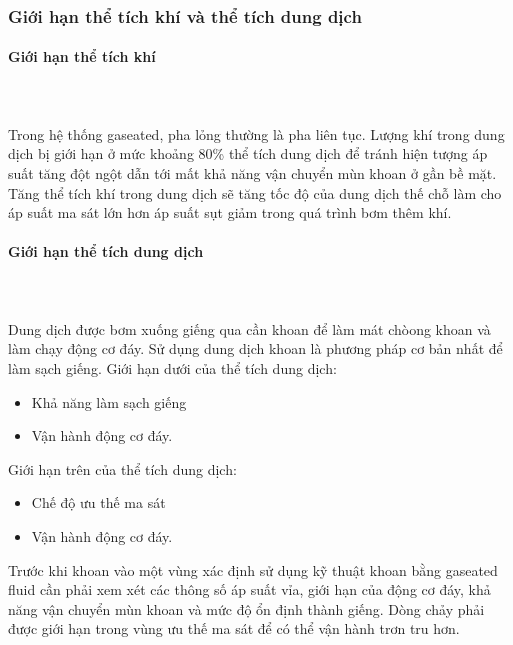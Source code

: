 \documentclass[12pt,a4paper]{article}
\newcommand{\subsubsubsection}[1]{\paragraph{#1}\mbox{}\\}
\begin{document}
\subsubsection{Giới hạn thể tích khí và thể tích dung dịch}
	\subsubsubsection{Giới hạn thể tích khí}\\
	Trong hệ thống gaseated, pha lỏng thường là pha liên tục. Lượng khí trong dung dịch bị giới hạn ở mức khoảng 80\% thể tích dung dịch để tránh hiện tượng áp suất tăng đột ngột dẫn tới mất khả năng vận chuyển mùn khoan ở gần bề mặt.\\
	Tăng thể tích khí trong dung dịch sẽ tăng tốc độ của dung dịch thế chỗ làm cho áp suất ma sát lớn hơn áp suất sụt giảm trong quá trình bơm thêm khí.
	\subsubsubsection{Giới hạn thể tích dung dịch}\\
	Dung dịch được bơm xuống giếng qua cần khoan để làm mát chòong khoan và làm chạy động cơ đáy. Sử dụng dung dịch khoan là phương pháp cơ bản nhất để làm sạch giếng. Giới hạn dưới của thể tích dung dịch:
	\begin{itemize}
		\item Khả năng làm sạch giếng
		\item Vận hành động cơ đáy.
	\end{itemize}
	
	Giới hạn trên của thể tích dung dịch:
	\begin{itemize}
		\item Chế độ ưu thế ma sát
		\item Vận hành động cơ đáy.
	\end{itemize}
	
	Trước khi khoan vào một vùng xác định sử dụng kỹ thuật khoan bằng gaseated fluid cần phải xem xét các thông số áp suất vỉa, giới hạn của động cơ đáy, khả năng vận chuyển mùn khoan và mức độ ổn định thành giếng. Dòng chảy phải được giới hạn trong vùng ưu thế ma sát để có thể vận hành trơn tru hơn. 
\end{document}
